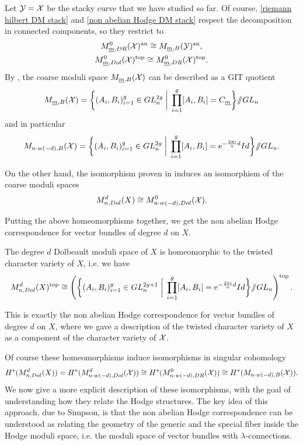 \documentclass{article}
\begin{document}
Let $\mathcal{Y} = \mathcal{X}$ be the stacky curve that we have studied so far. Of course, \eqref{riemann hilbert DM stack} and \eqref{non abelian Hodge DM stack} respect the decomposition in connected components, so they restrict to
\begin{gather}
M_{\underline{m}, DR}^0(\mathcal{X})^{\text{an}} \cong M_{\underline{m}, B}(\mathcal{Y})^{\text{an}}, \\
M_{\underline{m}, Dol}^0(\mathcal{X})^{\text{top}} \cong M_{\underline{m}, DR}^0(\mathcal{X})^{\text{top}}.
\end{gather}
By , the coarse moduli space $M_{\underline{m}, B}(\mathcal{X})$ can be described as a GIT quotient
\begin{equation}
M_{\underline{m}, B}(\mathcal{X}) = \bigg\{ (A_i, B_i)_{i = 1}^g \in GL_n^{2g} \;\bigg|\; \prod_{i=1}^{g}[A_i, B_i] = C_{\underline{m}} \bigg\} /\!\!/ GL_n
\end{equation}
and in particular
\begin{equation}
M_{n \cdot w(-d), B}(\mathcal{X}) = \bigg\{ (A_i, B_i)_{i = 1}^g \in GL_n^{2g} \;\bigg|\; \prod_{i=1}^{g}[A_i, B_i] = \mathrm{e}^{-\frac{2 \pi \mathrm{i}}{n} d} Id \bigg\} /\!\!/ GL_n.
\end{equation}

On the other hand, the isomorphism proven in  induces an isomorphism of the coarse moduli spaces
\begin{equation}
M_{n, Dol}^d(X) \cong M_{n \cdot w(-d), Dol}^0(\mathcal{X}).
\end{equation}

Putting the above homeomorphisms together, we get the non abelian Hodge correspondence for vector bundles of degree $d$ on $X$.
\begin{prop}
The degree $d$ Dolbeault moduli space of $X$ is homeomorphic to the twisted character variety of $X$, i.e. we have
\begin{equation}
M_{n, Dol}^d(X)^{\text{top}} \cong \left( \bigg\{ (A_i, B_i)_{i = 1}^g \in GL_n^{2g +1} \;\bigg|\; \prod_{i=1}^{g}[A_i, B_i] = \mathrm{e}^{-\frac{2 \pi \mathrm{i}}{n} d} Id \bigg\} /\!\!/ GL_n \right)^{\text{top}}.
\end{equation}
\end{prop}
This is exactly the non abelian Hodge correspondence for vector bundles of degree $d$ on $X$, where we gave a description of the twisted character variety of $X$ as a component of the character variety of $\mathcal{X}$.

Of course these homeomorphisms induce isomorphisms in singular cohomology
\begin{equation}
H^*(M_{n, Dol}^d(X)) = H^*(M_{n \cdot w(-d), Dol}^d(\mathcal{X})) \cong H^*(M_{n \cdot w(-d), DR}^0(\mathcal{X})) \cong H^*(M_{n \cdot w(-d), B}(\mathcal{X})).
\end{equation}
We now give a more explicit description of these isomorphisms, with the goal of understanding how they relate the Hodge structures. The key idea of this approach, due to Simpson, is that the non abelian Hodge correspondence can be understood as relating the geometry of the generic and the special fiber inside the Hodge moduli space, i.e. the moduli space of vector bundles with $\lambda$-connections.
\end{document}
